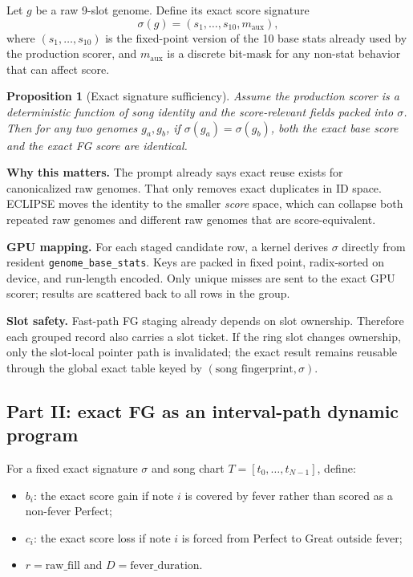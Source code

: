 \documentclass[11pt]{article}
\newtheorem{proposition}{Proposition}
\newcommand{\method}{ECLIPSE}
\begin{document}
Let $g$ be a raw 9-slot genome. Define its exact score signature
\[
\sigma(g) = (s_1,\ldots,s_{10}, m_{\mathrm{aux}}),
\]
where $(s_1,\ldots,s_{10})$ is the fixed-point version of the 10 base stats already used by the production scorer, and $m_{\mathrm{aux}}$ is a discrete bit-mask for any non-stat behavior that can affect score.

\begin{proposition}[Exact signature sufficiency]
Assume the production scorer is a deterministic function of song identity and the score-relevant fields packed into $\sigma$. Then for any two genomes $g_a,g_b$, if $\sigma(g_a)=\sigma(g_b)$, both the exact base score and the exact FG score are identical.
\end{proposition}

\textbf{Why this matters.} The prompt already says exact reuse exists for canonicalized raw genomes. That only removes exact duplicates in ID space. \method{} moves the identity to the smaller \emph{score} space, which can collapse both repeated raw genomes and different raw genomes that are score-equivalent.

\textbf{GPU mapping.} For each staged candidate row, a kernel derives $\sigma$ directly from resident \texttt{genome\_base\_stats}. Keys are packed in fixed point, radix-sorted on device, and run-length encoded. Only unique misses are sent to the exact GPU scorer; results are scattered back to all rows in the group.

\textbf{Slot safety.} Fast-path FG staging already depends on slot ownership. Therefore each grouped record also carries a slot ticket. If the ring slot changes ownership, only the slot-local pointer path is invalidated; the exact result remains reusable through the global exact table keyed by $(\text{song fingerprint},\sigma)$.

\subsection{Part II: exact FG as an interval-path dynamic program}

For a fixed exact signature $\sigma$ and song chart $T=[t_0,\ldots,t_{N-1}]$, define:
\begin{itemize}
    \item $b_i$: the exact score gain if note $i$ is covered by fever rather than scored as a non-fever Perfect;
    \item $c_i$: the exact score loss if note $i$ is forced from Perfect to Great outside fever;
    \item $r = \text{raw\_fill}$ and $D = \text{fever\_duration}$.
\end{itemize}
\end{document}
